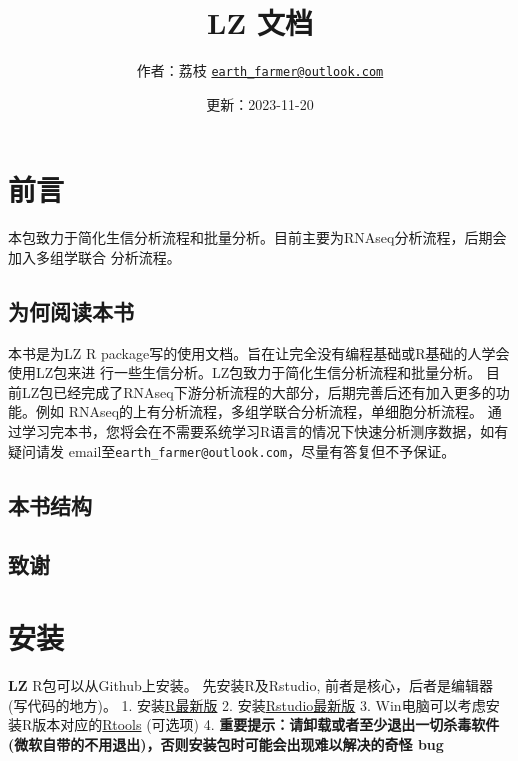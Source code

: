\documentclass[
]{book}
\title{LZ 文档}
\author{作者：荔枝 \href{mailto:earth_farmer@outlook.com}{\nolinkurl{earth\_farmer@outlook.com}}}
\date{更新：2023-11-20}
\begin{document}
\maketitle

{
\setcounter{tocdepth}{1}
\tableofcontents
}
\hypertarget{ux524dux8a00}{%
\chapter*{前言}\label{ux524dux8a00}}

本包致力于简化生信分析流程和批量分析。目前主要为RNAseq分析流程，后期会加入多组学联合
分析流程。

\hypertarget{ux4e3aux4f55ux9605ux8bfbux672cux4e66}{%
\section*{为何阅读本书}\label{ux4e3aux4f55ux9605ux8bfbux672cux4e66}}

本书是为LZ R package写的使用文档。旨在让完全没有编程基础或R基础的人学会使用LZ包来进
行一些生信分析。LZ包致力于简化生信分析流程和批量分析。
目前LZ包已经完成了RNAseq下游分析流程的大部分，后期完善后还有加入更多的功能。例如
RNAseq的上有分析流程，多组学联合分析流程，单细胞分析流程。
通过学习完本书，您将会在不需要系统学习R语言的情况下快速分析测序数据，如有疑问请发
email至\texttt{earth\_farmer@outlook.com}，尽量有答复但不予保证。

\hypertarget{ux672cux4e66ux7ed3ux6784}{%
\section*{本书结构}\label{ux672cux4e66ux7ed3ux6784}}

\hypertarget{ux81f4ux8c22}{%
\section*{致谢}\label{ux81f4ux8c22}}

\hypertarget{install}{%
\chapter{安装}\label{install}}

\textbf{LZ} R包可以从Github上安装。
先安装R及Rstudio, 前者是核心，后者是编辑器(写代码的地方)。
1. 安装\href{https://www.r-project.org/}{R最新版}
2. 安装\href{https://posit.co/download/rstudio-desktop/}{Rstudio最新版}
3. Win电脑可以考虑安装R版本对应的\href{https://cran.r-project.org/bin/windows/Rtools/}{Rtools} (可选项)
4. \textbf{重要提示：请卸载或者至少退出一切杀毒软件(微软自带的不用退出)，否则安装包时可能会出现难以解决的奇怪
bug}
\end{document}
